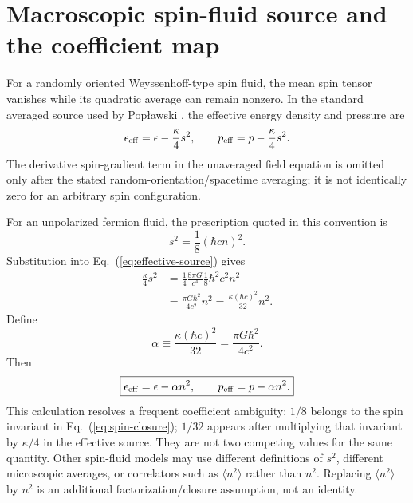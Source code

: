 \documentclass[11pt]{article}
\begin{document}
\section{Macroscopic spin-fluid source and the coefficient map}
For a randomly oriented Weyssenhoff-type spin fluid, the mean spin tensor vanishes while its quadratic average can remain nonzero. In the standard averaged source used by Pop\l{}awski \cite{Poplawski2010,Poplawski2016}, the effective energy density and pressure are
\begin{equation}
\epsilon_{\rm eff}=\epsilon-\frac{\kappa}{4}s^2,
\qquad
p_{\rm eff}=p-\frac{\kappa}{4}s^2.
\label{eq:effective-source}
\end{equation}
The derivative spin-gradient term in the unaveraged field equation is omitted only after the stated random-orientation/spacetime averaging; it is not identically zero for an arbitrary spin configuration.

For an unpolarized fermion fluid, the prescription quoted in this convention is
\begin{equation}
s^2=\frac18(\hbar c n)^2.
\label{eq:spin-closure}
\end{equation}
Substitution into Eq.~(\ref{eq:effective-source}) gives
\begin{align}
\frac{\kappa}{4}s^2
&=\frac{1}{4}\frac{8\pi G}{c^4}\frac18\hbar^2c^2n^2\\
&=\frac{\pi G\hbar^2}{4c^2}n^2
=\frac{\kappa(\hbar c)^2}{32}n^2.
\label{eq:alpha-derivation}
\end{align}
Define
\begin{equation}
\alpha\equiv\frac{\kappa(\hbar c)^2}{32}
=\frac{\pi G\hbar^2}{4c^2}.
\label{eq:alpha}
\end{equation}
Then
\begin{equation}
\boxed{\epsilon_{\rm eff}=\epsilon-\alpha n^2,\qquad
p_{\rm eff}=p-\alpha n^2.}
\label{eq:effective-alpha}
\end{equation}
This calculation resolves a frequent coefficient ambiguity: $1/8$ belongs to the spin invariant in Eq.~(\ref{eq:spin-closure}); $1/32$ appears after multiplying that invariant by $\kappa/4$ in the effective source. They are not two competing values for the same quantity. Other spin-fluid models may use different definitions of $s^2$, different microscopic averages, or correlators such as $\langle n^2\rangle$ rather than $n^2$. Replacing $\langle n^2\rangle$ by $n^2$ is an additional factorization/closure assumption, not an identity.
\end{document}
